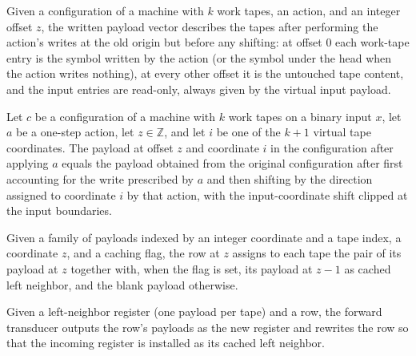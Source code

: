 \begin{definition}
\label{Complexity.sourceWrittenPayload}
\leanok
{}
Given a configuration of a machine with $k$ work tapes, an action, and an integer
offset $z$, the written payload vector describes the tapes after performing the
action's writes at the old origin but before any shifting: at offset $0$ each
work-tape entry is the symbol written by the action (or the symbol under the head when
the action writes nothing), at every other offset it is the untouched tape content,
and the input entries are read-only, always given by the virtual input payload.
\end{definition}

\begin{lemma}
\label{Complexity.sourcePayload_apply}
\leanok
{}
Let $c$ be a configuration of a machine with $k$ work tapes on a binary input $x$, let
$a$ be a one-step action, let $z\in\mathbb{Z}$, and let $i$ be one of the $k+1$ virtual
tape coordinates. The payload at offset $z$ and coordinate $i$ in the configuration
after applying $a$ equals the payload obtained from the original configuration after
first accounting for the write prescribed by $a$ and then shifting by the direction
assigned to coordinate $i$ by that action, with the input-coordinate shift clipped at
the input boundaries.
\end{lemma}

\begin{definition}
\label{Complexity.payloadRow}
\leanok
{}
Given a family of payloads indexed by an integer coordinate and a tape index, a
coordinate $z$, and a caching flag, the row at $z$ assigns to each tape the pair of
its payload at $z$ together with, when the flag is set, its payload at $z - 1$ as
cached left neighbor, and the blank payload otherwise.
\end{definition}

\begin{definition}
\label{Complexity.payloadForward}
\leanok
{}
Given a left-neighbor register (one payload per tape) and a row, the forward
transducer outputs the row's payloads as the new register and rewrites the row so that
the incoming register is installed as its cached left neighbor.
\end{definition}

